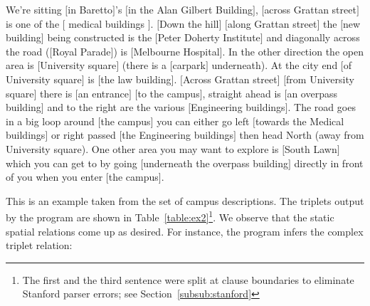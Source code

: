 \documentclass{acm_proc_article-sp}
\begin{document}
\begin{example}
\label{ex:c1}
We're sitting $[$in Baretto$]$'s $[$in the Alan Gilbert Building$]$, $[$across Grattan street$]$ is one of the $[$ medical buildings $]$. $[$Down the hill$]$ $[$along Grattan street$]$ the $[$new building$]$ being constructed is the $[$Peter Doherty Institute$]$ and diagonally across the road ($[$Royal Parade$]$) is $[$Melbourne Hospital$]$. In the other direction the open area is $[$University square$]$ (there is a $[$carpark$]$ underneath). At the city end $[$of University square$]$ is $[$the law building$]$. $[$Across Grattan street$]$ $[$from University square$]$ there is $[$an entrance$]$ $[$to the campus$]$, straight ahead is $[$an overpass building$]$ and to the right are the various $[$Engineering buildings$]$. The road goes in a big loop around $[$the campus$]$ you can either go left $[$towards the Medical buildings$]$ or right passed $[$the Engineering buildings$]$ then head North (away from University square). One other area you may want to explore is $[$South Lawn$]$ which you can get to by going $[$underneath the overpass building$]$ directly in front of you when you enter $[$the campus$]$.
\end{example}
This is an example taken from the set of campus descriptions. The triplets output by the program are shown in Table~\ref{table:ex2}\footnote{The first and the third sentence were split at clause boundaries to eliminate Stanford parser errors; see Section~\ref{subsub:stanford}}. We observe that the static spatial relations come up as desired. For instance, the program infers the complex triplet relation:
\end{document}
